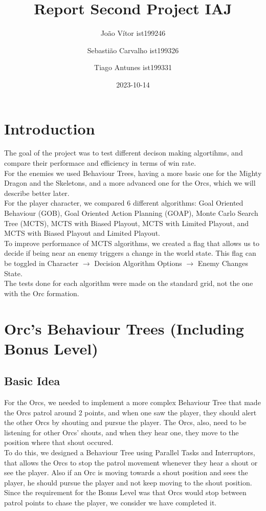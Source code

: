 \documentclass{article}
\title{Report Second Project IAJ}
\author{João Vítor ist199246
  \and Sebastião Carvalho ist199326
  \and Tiago Antunes ist199331}
\date{2023-10-14}
\begin{document}
  \maketitle
  \tableofcontents
  \newpage
  \section{Introduction}
  The goal of the project was to test different decison making algortihms, and compare their performace and efficiency in terms of win rate. \\
  For the enemies we used Behaviour Trees, having a more basic one for the Mighty Dragon and the Skeletons, and a more advanced one for the Orcs, 
  which we will describe better later.\\
  For the player character, we compared 6 different algorithms: Goal Oriented Behaviour (GOB), Goal Oriented Action Planning (GOAP), Monte Carlo Search Tree (MCTS),
  MCTS with Biased Playout, MCTS with Limited Playout, and MCTS with Biased Playout and Limited Playout.\\
  To improve performance of MCTS algorithms, we created a flag that allows us to decide if being near an enemy triggers a change in the world state. 
  This flag can be toggled in Character $\rightarrow$ Decision Algorithm Options $\rightarrow$ Enemy Changes State. \\
  The tests done for each algorithm were made on the standard grid, not the one with the Orc formation.
  \section{Orc's Behaviour Trees (Including Bonus Level)}
  \subsection{Basic Idea}
  For the Orcs, we needed to implement a more complex Behaviour Tree that made the Orcs patrol around 2 points, and when one saw the player, they should alert the other Orcs
  by shouting and pursue the player. The Orcs, also, need to be listening for other Orcs' shouts, and when they hear one, they move to the position where that shout occured. \\
  To do this, we designed a Behaviour Tree using Parallel Tasks and Interruptors, that allows the Orcs to stop the patrol movement whenever they hear a shout or 
  see the player. Also if an Orc is moving towards a shout position and sees the player, he should pursue the player and not keep moving to the shout position.\\
  Since the requirement for the Bonus Level was that Orcs would stop between patrol points to chase the player, we consider we have completed it.
\end{document}

